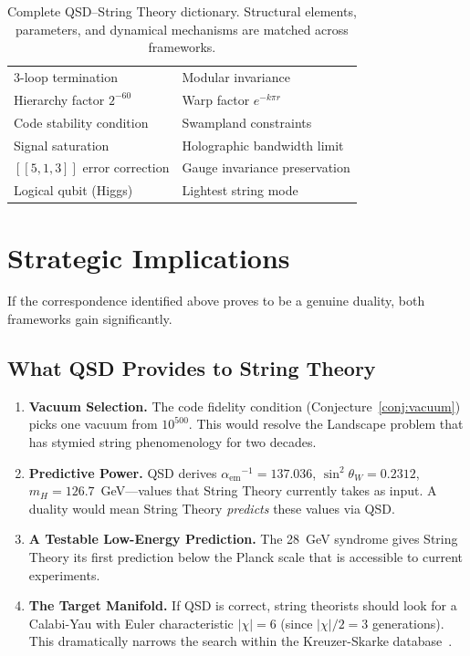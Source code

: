 \documentclass[11pt,a4paper]{article}
\theoremstyle{definition}
\newcommand{\mH}{m_H}
\newcommand{\aem}{{\alpha_{\mathrm{em}}}}
\begin{document}
\begin{table}[h]
\begin{tabular}{p{5.8cm}p{5.8cm}}
3-loop termination & Modular invariance \\
Hierarchy factor $2^{-60}$ & Warp factor $e^{-k\pi r}$ \\
Code stability condition & Swampland constraints \\
Signal saturation & Holographic bandwidth limit \\
$[[5,1,3]]$ error correction & Gauge invariance preservation \\
Logical qubit (Higgs) & Lightest string mode \\
\bottomrule
\end{tabular}
\caption{Complete QSD--String Theory dictionary.  Structural elements,
parameters, and dynamical mechanisms are matched across frameworks.}
\label{tab:full_dictionary}
\end{table}


\section{Strategic Implications}
\label{sec:strategy}

If the correspondence identified above proves to be a genuine duality, both
frameworks gain significantly.

\subsection{What QSD Provides to String Theory}

\begin{enumerate}
    \item \textbf{Vacuum Selection.}  The code fidelity condition
          (Conjecture~\ref{conj:vacuum}) picks one vacuum from $10^{500}$.
          This would resolve the Landscape problem that has stymied string
          phenomenology for two decades.

    \item \textbf{Predictive Power.}  QSD derives $\aem^{-1} = 137.036$,
          $\sin^2\theta_W = 0.2312$, $\mH = 126.7$~GeV---values that
          String Theory currently takes as input.  A duality would mean
          String Theory \emph{predicts} these values via QSD.

    \item \textbf{A Testable Low-Energy Prediction.}  The 28~GeV syndrome
          gives String Theory its first prediction below the Planck scale
          that is accessible to current experiments.

    \item \textbf{The Target Manifold.}  If QSD is correct, string
          theorists should look for a Calabi-Yau with Euler
          characteristic $|\chi| = 6$ (since $|\chi|/2 = 3$ generations).
          This dramatically narrows the search within the Kreuzer-Skarke
          database~\cite{KreuzerSkarke2000}.
\end{enumerate}
\end{document}

